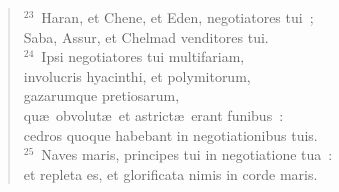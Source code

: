 \begin{flushleft}
\begin{verse}
${}^{23}$~Haran, et Chene, et Eden, negotiatores tui~;\\ Saba, Assur, et Chelmad venditores tui.\\
${}^{24}$~Ipsi negotiatores tui multifariam,\\ involucris hyacinthi, et polymitorum,\\ gazarumque pretiosarum,\\ qu\ae\ obvolut\ae\ et astrict\ae\ erant funibus~:\\ cedros quoque habebant in negotiationibus tuis.\\
${}^{25}$~Naves maris, principes tui in negotiatione tua~:\\ et repleta es, et glorificata nimis in corde maris.\end{verse}\end{flushleft}


